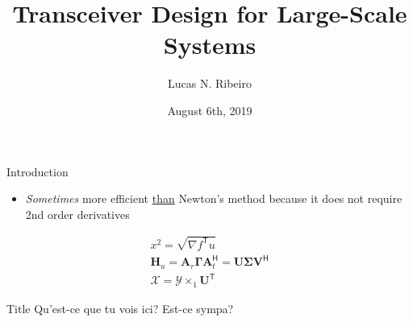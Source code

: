 \documentclass[12pt]{beamer}
\title{Transceiver Design for Large-Scale Systems}
\author{Lucas N. Ribeiro}
\institute{Universidade Federal do Cear\'a, Fortaleza}
\date{August 6th, 2019}
\newcommand{\tran}{\mathsf{T}}
\newcommand{\hermit}{\mathsf{H}}
\newcommand{\mc}[1]{\ensuremath{\mathcal{#1}}}
\begin{document}
 
 
\begin{frame}[allowframebreaks]{Introduction}
	\begin{itemize}
		\item \emph{Sometimes} more efficient \underline{than} \alert{Newton's} method because it does not require 2nd order derivatives
	\end{itemize}
	\begin{gather}
		x^2 = \sqrt{\nabla f^\tran u}\\
		\bm{H}_u = \bm{A}_r \bm{\Gamma} \bm{A}_t^\hermit = \bm{U} \bm{\Sigma} \bm{V}^\hermit\\
		\mc{X} = \mc{Y} \times_1 \bm{U}^\tran
	\end{gather}
	\begin{block}{Title}
		Qu'est-ce que tu vois ici? Est-ce sympa?
	\end{block}
\end{frame}
\end{document}
